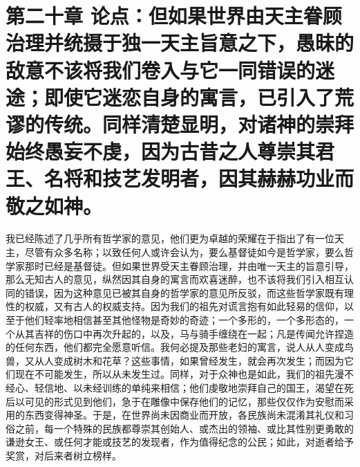 
\section{第二十章 论点：但如果世界由天主眷顾治理并统摄于独一天主旨意之下，愚昧的敌意不该将我们卷入与它一同错误的迷途；即使它迷恋自身的寓言，已引入了荒谬的传统。同样清楚显明，对诸神的崇拜始终愚妄不虔，因为古昔之人尊崇其君王、名将和技艺发明者，因其赫赫功业而敬之如神。}

我已经陈述了几乎所有哲学家的意见，他们更为卓越的荣耀在于指出了有一位天主，尽管有众多名称；以致任何人或许会认为，要么基督徒如今是哲学家，要么哲学家那时已经是基督徒。但如果世界受天主眷顾治理，并由唯一天主的旨意引导，那么无知古人的意见，纵然因其自身的寓言而欢喜迷醉，也不该将我们引入相互认同的错误，因为这种意见已被其自身的哲学家的意见所反驳，而这些哲学家既有理性的权威，又有古人的权威支持。因为我们的祖先对谎言抱有如此轻易的信仰，以至于他们轻率地相信甚至其他怪物是奇妙的奇迹；一个多形的，一个多形态的，一个从其吉祥的伤口中再次升起的，以及，马与骑手缠绕在一起；凡是传闻允许捏造的任何东西，他们都完全愿意听信。我何必提及那些老妇的寓言，说人从人变成鸟兽，又从人变成树木和花草？这些事情，如果曾经发生，就会再次发生；而因为它们现在不可能发生，所以从未发生过。同样，对于众神也是如此，我们的祖先漫不经心、轻信地、以未经训练的单纯来相信；他们虔敬地崇拜自己的国王，渴望在死后以可见的形式见到他们，急于在雕像中保存他们的记忆，那些仅仅作为安慰而采用的东西变得神圣。于是，在世界尚未因商业而开放，各民族尚未混淆其礼仪和习俗之前，每一个特殊的民族都尊崇其创始人、或杰出的领袖、或比其性别更勇敢的谦逊女王、或任何才能或技艺的发现者，作为值得纪念的公民；如此，对逝者给予奖赏，对后来者树立榜样。\par


